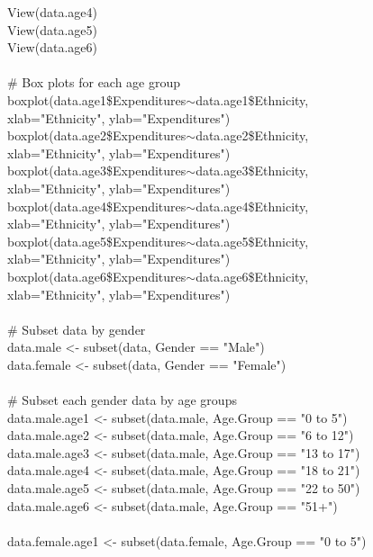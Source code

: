 \documentclass[12pt,letterpaper]{article}
\begin{document}
{		View(data.age4)\\
		View(data.age5)\\
		View(data.age6)\\
		\ \\
		\# Box plots for each age group\\
		boxplot(data.age1\$Expenditures$\sim$data.age1\$Ethnicity,\\ 
		\indent xlab="Ethnicity", ylab="Expenditures")\\
		boxplot(data.age2\$Expenditures$\sim$data.age2\$Ethnicity,\\
		\indent xlab="Ethnicity", ylab="Expenditures")\\
		boxplot(data.age3\$Expenditures$\sim$data.age3\$Ethnicity,\\
		\indent xlab="Ethnicity", ylab="Expenditures")\\
		boxplot(data.age4\$Expenditures$\sim$data.age4\$Ethnicity,\\
		\indent xlab="Ethnicity", ylab="Expenditures")\\
		boxplot(data.age5\$Expenditures$\sim$data.age5\$Ethnicity,\\
		\indent xlab="Ethnicity", ylab="Expenditures")\\
		boxplot(data.age6\$Expenditures$\sim$data.age6\$Ethnicity,\\
		\indent xlab="Ethnicity", ylab="Expenditures")\\
		\ \\
		\# Subset data by gender\\
		data.male <- subset(data, Gender == "Male")\\
		data.female <- subset(data, Gender == "Female")\\
		\ \\
		\# Subset each gender data by age groups\\
		data.male.age1 <- subset(data.male, Age.Group == "0 to 5")\\
		data.male.age2 <- subset(data.male, Age.Group == "6 to 12")\\
		data.male.age3 <- subset(data.male, Age.Group == "13 to 17")\\
		data.male.age4 <- subset(data.male, Age.Group == "18 to 21")\\
		data.male.age5 <- subset(data.male, Age.Group == "22 to 50")\\
		data.male.age6 <- subset(data.male, Age.Group == "51+")\\
		\ \\
		data.female.age1 <- subset(data.female, Age.Group == "0 to 5")\\
}
\end{document}
